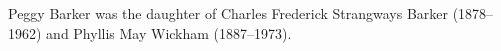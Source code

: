 Peggy Barker was the daughter of Charles Frederick Strangways Barker (1878--1962) and Phyllis May Wickham (1887--1973).
